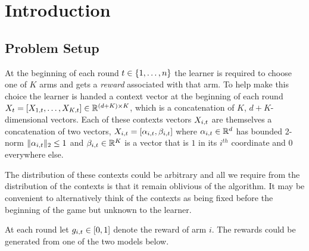\section{Introduction}
 
\subsection{Problem Setup}

At the beginning of each round $t \in \{1,\ldots, n\}$ the learner is required to choose one of $K$ arms and gets a \emph{reward} associated with that arm. To help make this choice the learner is handed a context vector at the beginning of each round $X_{t} = [X_{1,t},\ldots,X_{K,t}] \in \mathbb{R}^{(d+K)\times K}$, which is a concatenation of $K$, $d+K$-dimensional vectors. Each of these contexts vectors $X_{i,t}$ are themselves a concatenation of two vectors, $X_{i,t} = [\alpha_{i,t},  \beta_{i,t}]$ where $\alpha_{i,t} \in \mathbb{R}^d$ has bounded 2-norm $\lVert \alpha_{i,t} \rVert_2 \le 1$ and $\beta_{i,t} \in \mathbb{R}^K$ is a vector that is $1$ in its $i^{th}$ coordinate and 0 everywhere else.

The distribution of these contexts could be arbitrary and all we require from the distribution of the contexts is that it remain oblivious of the algorithm. It may be convenient to alternatively think of the contexts as being fixed before the beginning of the game but unknown to the learner. 

At each round let $g_{i,t} \in [0,1]$ denote the reward of arm $i$. The rewards could be generated from one of the two models below.
\\


